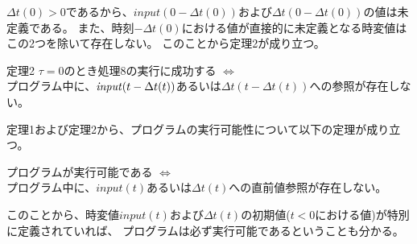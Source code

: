 $\Delta t(0) > 0$であるから、$input(0-\Delta t(0))$および$\Delta t(0-\Delta t(0))$の値は未定義である。
また、時刻$-\Delta t(0)$における値が直接的に未定義となる時変値はこの2つを除いて存在しない。
このことから定理2が成り立つ。
\begin{itembox}[l]{定理2}
  $\tau = 0$のとき処理8の実行に成功する $\Longleftrightarrow$ \\
  プログラム中に、${\it input}(t - \Delta t(t))$あるいは$\Delta t(t - \Delta t(t))$への参照が存在しない。
\end{itembox}

定理1および定理2から、プログラムの実行可能性について以下の定理が成り立つ。
\begin{screen}
  プログラムが実行可能である $\Longleftrightarrow$ \\
  プログラム中に、$input(t)$あるいは$\Delta t(t)$への直前値参照が存在しない。
\end{screen}

このことから、時変値$input(t)$および$\Delta t(t)$の初期値($t < 0$における値)が特別に定義されていれば、
プログラムは必ず実行可能であるということも分かる。
